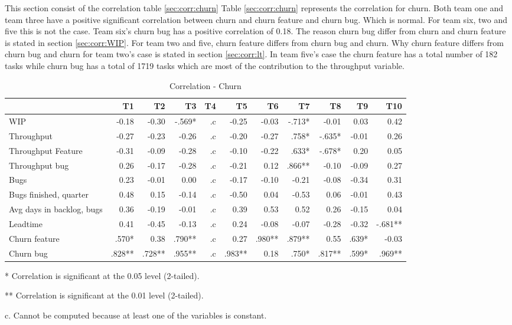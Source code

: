 \documentclass[UKenglish]{ifimaster}  %
\begin{document}
This section consist of the correlation table \ref{sec:corr:churn}
Table \ref{sec:corr:churn} represents the correlation for churn. Both team one and team three have a positive significant correlation between churn and churn feature and churn bug. Which is normal. For team six, two and five this is not the case. Team six's churn bug has a positive correlation of 0.18. The reason churn bug differ from churn and churn feature is stated in section \ref{sec:corr:WIP}. For team two and five, churn feature differs from churn bug and churn.  Why churn feature differs from churn bug and churn for team two's case is stated in section \ref{sec:corr:lt}. In team five's case the churn feature has a total number of 182 tasks while churn bug has a total of 1719 tasks which are most of the contribution to the throughput variable. 
\begin{table}[!htbp]
 \begin{adjustwidth}{-2.5cm}{}

 \centering
 \begin{tabular}{|l|r|r|r|r|r|r|r|r|r|r|}
\hline
 & T1 & T2 & T3 & T4 & T5 & T6 & T7 & T8 & T9 & T10\\ \hline
WIP &-0.18& -0.30& -.569*& .c& -0.25& -0.03& -.713*& -0.01& 0.03& 0.42\\ \hline
Throughput &-0.27& -0.23& -0.26& .c& -0.20& -0.27& .758*& -.635*& -0.01& 0.26\\ \hline
Throughput Feature &-0.31& -0.09& -0.28& .c& -0.10& -0.22& .633*& -.678*& 0.20& 0.05\\ \hline
Throughput bug &0.26& -0.17& -0.28& .c& -0.21& 0.12& .866**& -0.10& -0.09& 0.27\\ \hline
Bugs &0.23& -0.01& 0.00& .c& -0.17& -0.10& -0.21& -0.08& -0.34& 0.31\\ \hline
Bugs finished, quarter &0.48& 0.15& -0.14& .c& -0.50& 0.04& -0.53& 0.06& -0.01& 0.43\\ \hline
Avg days in backlog, bugs &0.36& -0.19& -0.01& .c& 0.39& 0.53& 0.52& 0.26& -0.15& 0.04\\ \hline
Leadtime &0.41& -0.45& -0.13& .c& 0.24& -0.08& -0.07& -0.28& -0.32& -.681**\\ \hline
Churn feature &.570*& 0.38& .790**& .c& 0.27& .980**& .879**& 0.55& .639*& -0.03\\ \hline
Churn bug &.828**
& .728**
& .955**
& .c& .983**
& 0.18& .750*
& .817**
& .599*
& .969**
\\ \hline
\end{tabular}
 \caption{Correlation - Churn}
 \label{corr:churn}
 \centerline {* Correlation is significant at the 0.05 level (2-tailed).}
\centerline{** Correlation is significant at the 0.01 level (2-tailed).}
\centerline{c. Cannot be computed because at least one of the variables is constant.}
\end{adjustwidth}
\end{table}
\end{document}

